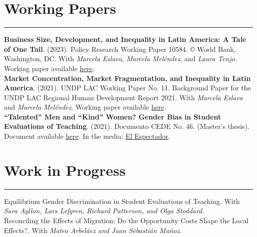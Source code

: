 \documentclass[12pt, letterpaper]{article}
\begin{document}
\vspace*{-4mm}

\section*{Working Papers}
\vspace*{-8mm}
\noindent \rule{\linewidth}{0.2mm}

\noindent \textbf{Business Size, Development, and Inequality in Latin America: A Tale of One Tail}. (2023). Policy Research Working Paper 10584. © World Bank, Washington, DC. With \textit{Marcela Eslava}, \textit{Marcela Meléndez}, and \textit{Laura Tenjo}. Working paper available \href{https://nicolasurdaneta.github.io/documents/WB_Business_Size.pdf}{here}. \\ [-3mm]

\noindent \textbf{Market Concentration, Market Fragmentation, and Inequality in Latin America}. (2021). UNDP LAC Working Paper No. 11. Background Paper for the UNDP LAC Regional Human Development Report 2021.  With \textit{Marcela Eslava} and \textit{Marcela Meléndez}. Working paper available \href{https://www.latinamerica.undp.org/content/rblac/en/home/library/poverty/market-concentration--market-fragmentation--and-inequality-in-la.html}{here}. \\ [-3mm]

\noindent \textbf{``Talented'' Men and ``Kind'' Women? Gender Bias in Student Evaluations of Teaching}. (2021). Documento CEDE No. 46. (Master's thesis). Document available \href{https://papers.ssrn.com/sol3/papers.cfm?abstract_id=3919797}{here}. In the media: \href{https://www.elespectador.com/educacion/los-profes-crack-y-las-profes-amables-el-sesgo-de-genero-en-las-aulas/}{El Espectador}.

\vspace{-5mm}

\section*{Work in Progress}
\vspace*{-8mm}
\noindent \rule{\linewidth}{0.2mm}
\noindent Equilibrium Gender Discrimination in Student Evaluations of Teaching. With \textit{Sara Ayllon, Lars Lefgren, Richard Patterson, and Olga Stoddard}. \\ [-3mm]

\noindent Reconciling the Effects of Migration: Do the Opportunity Costs Shape the Local Effects?. With \textit{Mateo Arbeláez and Juan Sebastián Muñoz}. \\ [-3mm]
\end{document}
